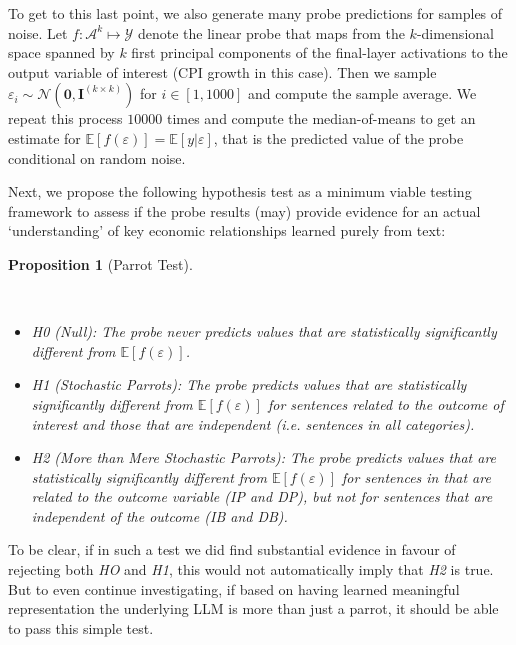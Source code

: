 \documentclass{article}
\theoremstyle{plain}
\newtheorem{proposition}[theorem]{Proposition}
\theoremstyle{definition}
\theoremstyle{remark}
\begin{document}
To get to this last point, we also generate many probe predictions for samples of noise. Let \(f: \mathcal{A}^k \mapsto \mathcal{Y}\) denote the linear probe that maps from the \(k\)-dimensional space spanned by \(k\) first principal components of the final-layer activations to the output variable of interest (CPI growth in this case). Then we sample \(\varepsilon_i \sim \mathcal{N}(\mathbf{0},\mathbf{I}^{(k \times k)})\) for \(i \in [1,1000]\) and compute the sample average. We repeat this process \(10000\) times and compute the median-of-means to get an estimate for \(\mathbb{E}[f(\varepsilon)]=\mathbb{E}[y|\varepsilon]\), that is the predicted value of the probe conditional on random noise.

Next, we propose the following hypothesis test as a minimum viable testing framework to assess if the probe results (may) provide evidence for an actual `understanding' of key economic relationships learned purely from text:

\begin{proposition}[Parrot
Test]\protect\hypertarget{prp-line}{}\label{prp-line}

~

\begin{itemize}
\setlength\itemsep{1px}
\item
  \emph{H0} (Null): The probe never predicts values that are statistically significantly different from \(\mathbb{E}[f(\varepsilon)]\).
\item
  \emph{H1} (Stochastic Parrots): The probe predicts values that are statistically significantly different from \(\mathbb{E}[f(\varepsilon)]\) for sentences related to the outcome of interest \emph{and} those that are independent (i.e. sentences in all categories).
\item
  \emph{H2} (More than Mere Stochastic Parrots): The probe predicts values that are statistically significantly different from \(\mathbb{E} [f(\varepsilon)]\) for sentences in that are related to the outcome variable (IP and DP), but not for sentences that are independent of the outcome (IB and DB).
\end{itemize}
\end{proposition}


To be clear, if in such a test we did find substantial evidence in favour of rejecting both \emph{HO} and \emph{H1}, this would not automatically imply that \emph{H2} is true. But to even continue investigating, if based on having learned meaningful representation the underlying LLM is more than just a parrot, it should be able to pass this simple test.
\end{document}
